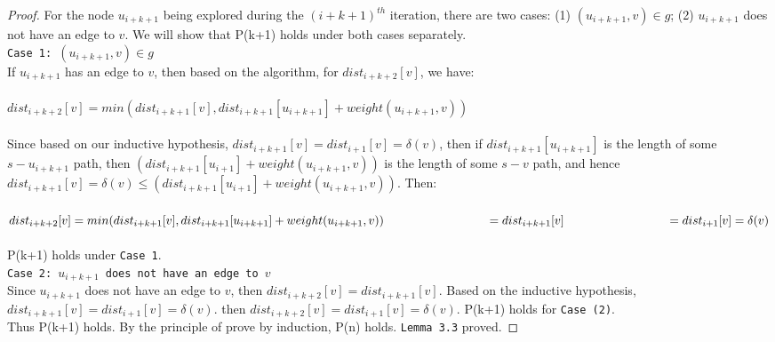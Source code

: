 \documentclass[11pt, oneside]{article}   	%
\newcommand\tab[1][1cm]{\hspace*{#1}}
\theoremstyle{definition}
\begin{document}
\begin{proof}
For the node $u_{i+k+1}$ being explored during the $(i+k+1)^{th}$ iteration, there are two cases: (1) $(u_{i+k+1}, v) \in g$; (2) $u_{i+k+1}$ does not have an edge to $v$. We will show that P(k+1) holds under both cases separately. 
\\
\texttt{Case 1: $(u_{i+k+1}, v) \in g$}
\\
If $u_{i+k+1}$ has an edge to $v$, then based on the algorithm, for $dist_{i+k+2}[v]$, we have: 
\\\\
  \tab $dist_{i+k+2}[v] = min(dist_{i+k+1}[v], dist_{i+k+1}[u_{i+k+1}] + weight(u_{i+k+1}, v))$
\\\\
Since based on our inductive hypothesis, $dist_{i+k+1}[v] = dist_{i+1}[v] = \delta(v)$, then if $dist_{i+k+1}[u_{i+k+1}] $ is the length of some $s-u_{i+k+1}$ path, then $(dist_{i+k+1}[u_{i+1}] + weight(u_{i+k+1}, v))$ is the length of some $s-v$ path, and hence $dist_{i+k+1}[v] = \delta(v) \leq (dist_{i+k+1}[u_{i+1}] + weight(u_{i+k+1}, v))$. Then: 
\\\\
 \tab $dist_{i+k+2}[v] = min(dist_{i+k+1}[v], dist_{i+k+1}[u_{i+k+1}] + weight(u_{i+k+1}, v)) \\
 \tab\tab\tab = dist_{i+k+1}[v]\\
 \tab\tab\tab = dist_{i+1}[v] = \delta(v)$
\\\\
P(k+1) holds under \texttt{Case 1}. 
\\
\texttt{Case 2: $u_{i+k+1}$ does not have an edge to $v$}
\\
Since $u_{i+k+1}$ does not have an edge to $v$, then $dist_{i+k+2}[v] = dist_{i+k+1}[v]$. Based on the inductive hypothesis, $dist_{i+k+1}[v] = dist_{i+1}[v] = \delta(v)$. then $dist_{i+k+2}[v] = dist_{i+1}[v] = \delta(v)$. P(k+1) holds for \texttt{Case (2)}. 
\\
Thus P(k+1) holds. By the principle of prove by induction, P(n) holds. \texttt{Lemma 3.3} proved. 

\end{proof}
\end{document}
